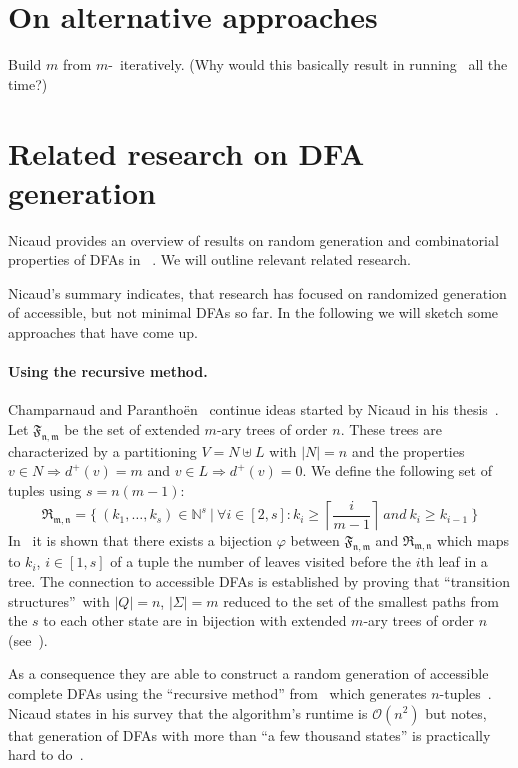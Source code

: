 \section{On alternative approaches}

Build $m$ from $m$-\CompDist\ iteratively. (Why would this basically result in running \CompDist\ all the time?)

\section{Related research on DFA generation}

Nicaud provides an overview of results on random generation and combinatorial properties of DFAs in ~\cite{Nic14}. We will outline relevant related research.

Nicaud's summary indicates, that research has focused on randomized generation of accessible, but not minimal DFAs so far. In the following we will sketch some approaches that have come up.

\paragraph*{Using the recursive method.}

Champarnaud and Paranthoën~\cite{CP05} continue ideas started by Nicaud in his thesis~\cite{Nic00}. Let $\mathfrak{F_{n,m}}$ be the set of extended $m$-ary trees of order $n$. These trees are characterized by a partitioning $V = N \uplus L$ with $|N| = n$ and the properties $v \in N \Rightarrow d^+(v) = m$ and $v \in L \Rightarrow d^+(v) = 0$. We define the following set of tuples using $s=n(m-1)$:
\[
    \mathfrak{R_{m,n}} = \{\ (k_1,\ldots,k_s) \in \mathbb{N}^s\ |\ \forall i\in [2,s]\colon k_i \geq \left\lceil\frac{i}{m-1}\right\rceil\ and\ k_i \geq k_{i-1}\ \}
\]
In~\cite[p. 6]{CP05} it is shown that there exists a bijection $\varphi$ between $\mathfrak{F_{n,m}}$ and $\mathfrak{R_{m,n}}$ which maps to $k_i$, $i\in[1,s]$ of a tuple the number of leaves visited before the $i$th leaf in a tree. The connection to accessible DFAs is established by proving that  ``transition structures\footnotemark''\ with $|Q|=n$, $|\Sigma|=m$ reduced to the set of the smallest paths from the $s$ to each other state are in bijection with extended $m$-ary trees of order $n$ (see~\cite[p. 8]{CP05}).

As a consequence they are able to construct a random generation of accessible complete DFAs using the ``recursive method'' from~\cite{NW78} which generates $n$-tuples~\cite[p. 10]{CP05}. Nicaud states in his survey that the algorithm's runtime is $\mathcal{O}(n^2)$ but notes, that generation of DFAs with more than ``a few thousand states'' is practically hard to do~\cite[pp. 10-11]{Nic14}.

